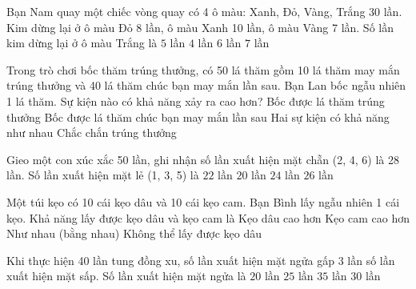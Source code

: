 \begin{ex} %
Bạn Nam quay một chiếc vòng quay có 4 ô màu: Xanh, Đỏ, Vàng, Trắng 30 lần. Kim dừng lại ở ô màu Đỏ 8 lần, ô màu Xanh 10 lần, ô màu Vàng 7 lần. Số lần kim dừng lại ở ô màu Trắng là
\choice
{\True $5$ lần}
{$4$ lần}
{$6$ lần}
{$7$ lần}
\end{ex}

\begin{ex} %
Trong trò chơi bốc thăm trúng thưởng, có 50 lá thăm gồm 10 lá thăm may mắn trúng thưởng và 40 lá thăm chúc bạn may mắn lần sau. Bạn Lan bốc ngẫu nhiên 1 lá thăm. Sự kiện nào có khả năng xảy ra cao hơn?
\choice
{Bốc được lá thăm trúng thưởng}
{\True Bốc được lá thăm chúc bạn may mắn lần sau}
{Hai sự kiện có khả năng như nhau}
{Chắc chắn trúng thưởng}
\end{ex}

\begin{ex} %
Gieo một con xúc xắc 50 lần, ghi nhận số lần xuất hiện mặt chẵn (2, 4, 6) là 28 lần. Số lần xuất hiện mặt lẻ (1, 3, 5) là
\choice
{\True $22$ lần}
{$20$ lần}
{$24$ lần}
{$26$ lần}
\end{ex}

\begin{ex} %
Một túi kẹo có 10 cái kẹo dâu và 10 cái kẹo cam. Bạn Bình lấy ngẫu nhiên 1 cái kẹo. Khả năng lấy được kẹo dâu và kẹo cam là
\choice
{Kẹo dâu cao hơn}
{Kẹo cam cao hơn}
{\True Như nhau (bằng nhau)}
{Không thể lấy được kẹo dâu}
\end{ex}

\begin{ex} %
Khi thực hiện 40 lần tung đồng xu, số lần xuất hiện mặt ngửa gấp 3 lần số lần xuất hiện mặt sấp. Số lần xuất hiện mặt ngửa là
\choice
{$20$ lần}
{$25$ lần}
{$35$ lần}
{\True $30$ lần}
\end{ex}

